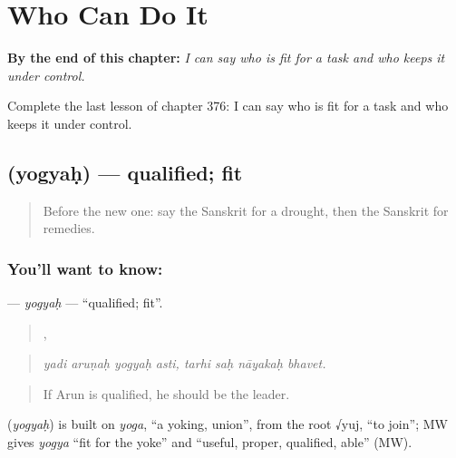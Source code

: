 
\chapter{Who Can Do It}
\label{ch:sa-who-can-do-it}

\begin{chapteropening}
\textbf{By the end of this chapter:} \emph{I can say who is fit for a task and who keeps it under control.}

Complete the last lesson of chapter 376: I can say who is fit for a task and who keeps it under control.
\end{chapteropening}

\section[\texorpdfstring{\sk{योग्यः} (yogyaḥ)}{योग्यः (yogyaḥ)}]{ (yogyaḥ) — qualified; fit}

\label{lesson:SA-C376-yogyah}



\begin{quote}
Before the new one: say the Sanskrit for a drought, then the Sanskrit for remedies.
\end{quote}

\subsection*{You'll want to know: }
\textbf{} — \emph{yogyaḥ} — \textquotedblleft{}qualified; fit\textquotedblright{}.

\begin{quote}
   ,    
\end{quote}

\begin{quote}
\emph{yadi aruṇaḥ yogyaḥ asti, tarhi saḥ nāyakaḥ bhavet.}
\end{quote}

\begin{quote}
If Arun is qualified, he should be the leader.
\end{quote}

\begin{cousinweb}
\textbf{} (\emph{yogyaḥ}) is built on \emph{yoga}, \textquotedblleft{}a yoking, union\textquotedblright{}, from the root √yuj, \textquotedblleft{}to join\textquotedblright{}; MW gives \emph{yogya} \textquotedblleft{}fit for the yoke\textquotedblright{} and \textquotedblleft{}useful, proper, qualified, able\textquotedblright{} (MW).
\end{cousinweb}

